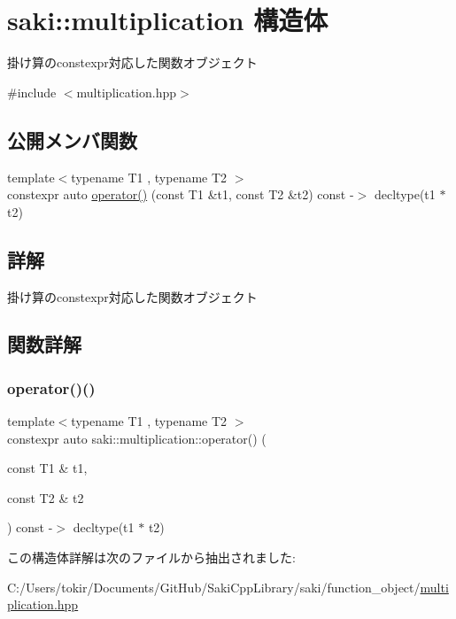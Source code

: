 \hypertarget{structsaki_1_1multiplication}{}\section{saki\+:\+:multiplication 構造体}
\label{structsaki_1_1multiplication}


掛け算のconstexpr対応した関数オブジェクト  




{\ttfamily \#include $<$multiplication.\+hpp$>$}

\subsection*{公開メンバ関数}
\begin{DoxyCompactItemize}
\item 
{\footnotesize template$<$typename T1 , typename T2 $>$ }\\constexpr auto \mbox{\hyperlink{structsaki_1_1multiplication_a064e2d28b9933a03efeaa2c2832fb274}{operator()}} (const T1 \&t1, const T2 \&t2) const -\/$>$ decltype(t1 $\ast$t2)
\end{DoxyCompactItemize}


\subsection{詳解}
掛け算のconstexpr対応した関数オブジェクト 

\subsection{関数詳解}
\mbox{\label{structsaki_1_1multiplication_a064e2d28b9933a03efeaa2c2832fb274}} 
\subsubsection{\texorpdfstring{operator()()}{operator()()}}
{\footnotesize\ttfamily template$<$typename T1 , typename T2 $>$ \\
constexpr auto saki\+::multiplication\+::operator() (\begin{DoxyParamCaption}\item[{const T1 \&}]{t1,  }\item[{const T2 \&}]{t2 }\end{DoxyParamCaption}) const -\/$>$ decltype(t1 $\ast$ t2)
	\hspace{0.3cm}{\ttfamily [inline]}}



この構造体詳解は次のファイルから抽出されました\+:\begin{DoxyCompactItemize}
\item 
C\+:/\+Users/tokir/\+Documents/\+Git\+Hub/\+Saki\+Cpp\+Library/saki/function\+\_\+object/\mbox{\hyperlink{multiplication_8hpp}{multiplication.\+hpp}}\end{DoxyCompactItemize}

